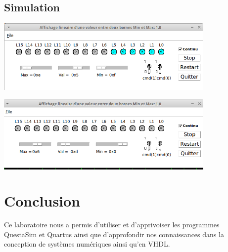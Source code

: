 \subsection{Simulation}

\begin{minipage}{\textwidth}
	\center
	\includegraphics[width = 0.8\textwidth]{figures/mode_opt_depass_bas.png}
	\label{fig:8}
\end{minipage}

\begin{minipage}{\textwidth}
	\center
	\includegraphics[width = 0.8\textwidth]{figures/mode_base_depass_haut.png}
	\label{fig:9}
\end{minipage}

\section{Conclusion}

Ce laboratoire nous a permis d'utiliser et d'apprivoiser les programmes QuestaSim et Quartus ainsi que d'approfondir nos connaissances dans la conception de systèmes numériques ainsi qu'en VHDL.


